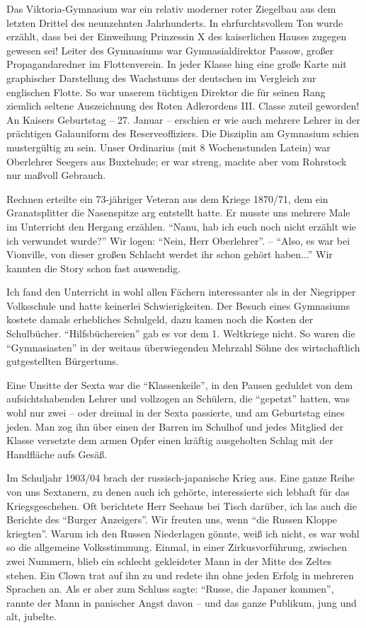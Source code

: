 Das Viktoria-Gymnasium war ein relativ moderner roter Ziegelbau aus dem letzten Drittel des neunzehnten Jahrhunderts. In ehrfurchtsvollem Ton wurde erzählt, dass bei der Einweihung Prinzessin X des kaiserlichen Hauses zugegen gewesen sei! Leiter des Gymnasiums war Gymnasialdirektor Passow, großer Propagandaredner im Flottenverein. In jeder Klasse hing eine große Karte mit graphischer Darstellung des Wachstums der deutschen im Vergleich zur englischen Flotte. So war unserem tüchtigen Direktor die für seinen Rang ziemlich seltene Auszeichnung des Roten Adlerordens III. Classe zuteil geworden! An Kaisers Geburtstag -- 27. Januar -- erschien er wie auch mehrere Lehrer in der prächtigen Galauniform des Reserveoffiziers. Die Disziplin am Gymnasium schien mustergültig zu sein. Unser Ordinarius (mit 8 Wochenstunden Latein) war Oberlehrer Seegers aus Buxtehude; er war streng, machte aber vom Rohrstock nur maßvoll Gebrauch.

Rechnen erteilte ein 73-jähriger Veteran aus dem Kriege 1870/71, dem ein Granatsplitter die Nasenspitze arg entstellt hatte. Er musste uns mehrere Male im Unterricht den Hergang erzählen. \enquote{Nanu, hab ich euch noch nicht erzählt wie ich verwundet wurde?} Wir logen: \enquote{Nein, Herr Oberlehrer}. -- \enquote{Also, es war bei Vionville, von dieser großen Schlacht werdet ihr schon gehört haben...} Wir kannten die Story schon fast auswendig.

Ich fand den Unterricht in wohl allen Fächern interessanter als in der Niegripper Volksschule und hatte keinerlei Schwierigkeiten. Der Besuch eines Gymnasiums kostete damals erhebliches Schulgeld, dazu kamen noch die Kosten der Schulbücher. \enquote{Hilfsbüchereien} gab es vor dem 1. Weltkriege nicht. So waren die \enquote{Gymnasiasten} in der weitaus überwiegenden Mehrzahl Söhne des wirtschaftlich gutgestellten Bürgertums.

Eine Unsitte der Sexta war die \enquote{Klassenkeile}, in den Pausen geduldet von dem aufsichtshabenden Lehrer und vollzogen an Schülern, die \enquote{gepetzt} hatten, was wohl nur zwei -- oder dreimal in der Sexta passierte, und am Geburtstag eines jeden. Man zog ihn über einen der Barren im Schulhof und jedes Mitglied der Klasse versetzte dem armen Opfer einen kräftig ausgeholten Schlag mit der Handfläche aufs Gesäß.

Im Schuljahr 1903/04 brach der russisch-japanische Krieg aus. Eine ganze Reihe von uns Sextanern, zu denen auch ich gehörte, interessierte sich lebhaft für das Kriegsgeschehen. Oft berichtete Herr Seehaus bei Tisch darüber, ich las auch die Berichte des \enquote{Burger Anzeigers}. Wir freuten uns, wenn \enquote{die Russen Kloppe kriegten}. Warum ich den Russen Niederlagen gönnte, weiß ich nicht, es war wohl so die allgemeine Volksstimmung. Einmal, in einer Zirkusvorführung, zwischen zwei Nummern, blieb ein schlecht gekleideter Mann in der Mitte des Zeltes stehen. Ein Clown trat auf ihn zu und redete ihn ohne jeden Erfolg in mehreren Sprachen an. Als er aber zum Schluss sagte: \enquote{Russe, die Japaner kommen}, rannte der Mann in panischer Angst davon -- und das ganze Publikum, jung und alt, jubelte.

